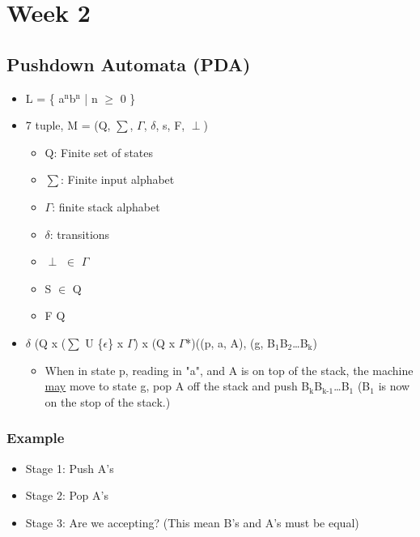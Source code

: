 \documentclass[11pt]{article}
\date{\today}
\title{}
\begin{document}
\tableofcontents

\section{Week 2}
\label{sec:orgb885510}
\subsection{Pushdown Automata (PDA)}
\label{sec:org9df5681}
\begin{itemize}
\item L = \{ a\(^{\text{n}}\)b\(^{\text{n}}\) | n \(\ge\) 0 \}
\item 7 tuple, M = (Q, \(\sum\), \(\Gamma\), \(\delta\), s, F, \(\perp\))
\begin{itemize}
\item Q: Finite set of states
\item \(\sum\): Finite input alphabet
\item \(\Gamma\): finite stack alphabet
\item \(\delta\): transitions
\item \(\perp\) \(\in\) \(\Gamma\)
\item S \(\in\) Q
\item F \subseteq Q
\end{itemize}

\item \(\delta\) \subseteq (Q x (\(\sum\) U \{\(\epsilon\)\} x \(\Gamma\)) x (Q x \(\Gamma\)*)((p, a, A), (g, B\(_{\text{1}}\)B\(_{\text{2}}\)\ldots{}B\(_{\text{k}}\))
\begin{itemize}
\item When in state p, reading in "a", and A is on top of the stack, the machine \uline{may} move
to state g, pop A off the stack and push B\(_{\text{k}}\)B\(_{\text{k-1}}\)\ldots{}B\(_{\text{1}}\) (B\(_{\text{1}}\) is now on the stop of the stack.)
\end{itemize}
\end{itemize}
\subsubsection{Example}
\label{sec:org3d64562}
\begin{itemize}
\item Stage 1: Push A's
\item Stage 2: Pop A's
\item Stage 3: Are we accepting? (This mean B's and A's must be equal)
\end{itemize}
\end{document}
